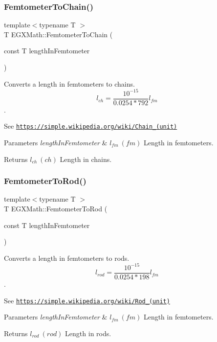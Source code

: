 \subsubsection{\texorpdfstring{Femtometer\+To\+Chain()}{FemtometerToChain()}}
{\footnotesize\ttfamily template$<$typename T $>$ \\
T E\+G\+X\+Math\+::\+Femtometer\+To\+Chain (\begin{DoxyParamCaption}\item[{const T}]{length\+In\+Femtometer }\end{DoxyParamCaption})}



Converts a length in femtometers to chains. \[ l_{ch}= \frac{10^{-15}}{0.0254 * 792} l_{fm} \]. 

See \href{https://simple.wikipedia.org/wiki/Chain_(unit)}{\tt https\+://simple.\+wikipedia.\+org/wiki/\+Chain\+\_\+(unit)} 
\begin{DoxyParams}{Parameters}
{\em length\+In\+Femtometer} & $ l_{fm}\ (fm)$ Length in femtometers. \\
\hline
\end{DoxyParams}
\begin{DoxyReturn}{Returns}
$ l_{ch}\ (ch)$ Length in chains. 
\end{DoxyReturn}
\mbox{\label{group___e_g_x_math-_conversions-_length_conversions-_femtometer-_surveyors_ga29f133c21de5eca2aa12f88caf6da86f}} 
\subsubsection{\texorpdfstring{Femtometer\+To\+Rod()}{FemtometerToRod()}}
{\footnotesize\ttfamily template$<$typename T $>$ \\
T E\+G\+X\+Math\+::\+Femtometer\+To\+Rod (\begin{DoxyParamCaption}\item[{const T}]{length\+In\+Femtometer }\end{DoxyParamCaption})}



Converts a length in femtometers to rods. \[ l_{rod}= \frac{10^{-15}}{0.0254 * 198} l_{fm} \]. 

See \href{https://simple.wikipedia.org/wiki/Rod_(unit)}{\tt https\+://simple.\+wikipedia.\+org/wiki/\+Rod\+\_\+(unit)} 
\begin{DoxyParams}{Parameters}
{\em length\+In\+Femtometer} & $ l_{fm}\ (fm)$ Length in femtometers. \\
\hline
\end{DoxyParams}
\begin{DoxyReturn}{Returns}
$ l_{rod}\ (rod)$ Length in rods. 
\end{DoxyReturn}
